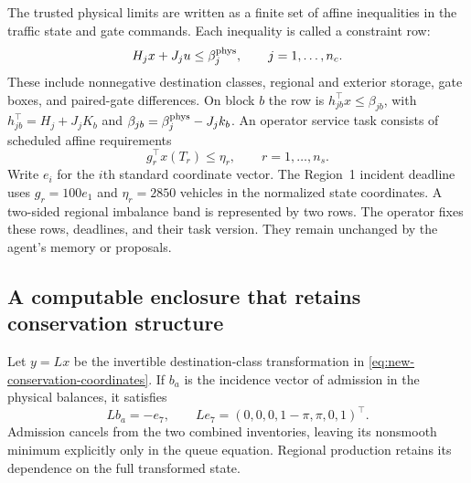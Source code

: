 \documentclass[preprint,12pt]{elsarticle}
\begin{document}
The trusted physical limits are written as a finite set of affine
inequalities in the traffic state and gate commands. Each inequality is
called a constraint row:
\begin{equation}
 H_jx+J_ju\le \beta_j^{\rm phys},
 \qquad j=1,\ldots,n_c.
 \label{eq:new-physical-rows}
\end{equation}
These include nonnegative destination classes, regional and exterior storage,
gate boxes, and paired-gate differences. On block $b$ the row is
$h_{jb}^{\top}x\le\beta_{jb}$, with
$h_{jb}^{\top}=H_j+J_jK_b$ and $\beta_{jb}=\beta_j^{\rm phys}-J_jk_b$.
An operator service task consists of scheduled affine requirements
\begin{equation}
 g_r^{\top}x(T_r)\le\eta_r,
 \qquad r=1,\ldots,n_s.
 \label{eq:new-service-rows}
\end{equation}
Write $e_i$ for the $i$th standard coordinate vector. The Region~1 incident
deadline uses $g_r=100e_1$ and $\eta_r=2850$ vehicles
in the normalized state coordinates. A two-sided regional imbalance band is
represented by two rows. The operator fixes these rows, deadlines, and their
task version. They remain unchanged by the agent's memory or proposals.

\subsection{A computable enclosure that retains conservation structure}

Let $y=Lx$ be the invertible destination-class transformation in
\eqref{eq:new-conservation-coordinates}. If $b_a$ is the incidence vector of
admission in the physical balances, it satisfies
\begin{equation}
 Lb_a=-e_7,
 \qquad Le_7=(0,0,0,1-\pi,\pi,0,1)^\top.
 \label{eq:new-conservation-incidence}
\end{equation}
Admission cancels from the two combined inventories, leaving its nonsmooth
minimum explicitly only in the queue equation. Regional production retains
its dependence on the full transformed state.
\end{document}
